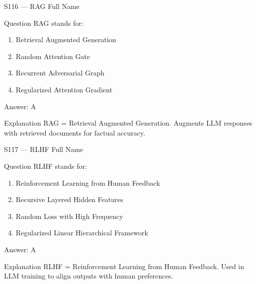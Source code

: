 \documentclass[aspectratio=169,8pt]{beamer}
\begin{document}
	\begin{frame}{S116 --- RAG Full Name}
		\begin{block}{Question}
			RAG stands for:
			\begin{enumerate}
				\item Retrieval Augmented Generation
				\item Random Attention Gate
				\item Recurrent Adversarial Graph
				\item Regularized Attention Gradient
			\end{enumerate}
		\end{block}
		\begin{exampleblock}{Answer: A}\end{exampleblock}
		\begin{block}{Explanation}
			RAG = Retrieval Augmented Generation. Augments LLM responses with retrieved documents for factual accuracy.
		\end{block}
	\end{frame}
	
	\begin{frame}{S117 --- RLHF Full Name}
		\begin{block}{Question}
			RLHF stands for:
			\begin{enumerate}
				\item Reinforcement Learning from Human Feedback
				\item Recursive Layered Hidden Features
				\item Random Loss with High Frequency
				\item Regularized Linear Hierarchical Framework
			\end{enumerate}
		\end{block}
		\begin{exampleblock}{Answer: A}\end{exampleblock}
		\begin{block}{Explanation}
			RLHF = Reinforcement Learning from Human Feedback. Used in LLM training to align outputs with human preferences.
		\end{block}
	\end{frame}
	
\end{document}
